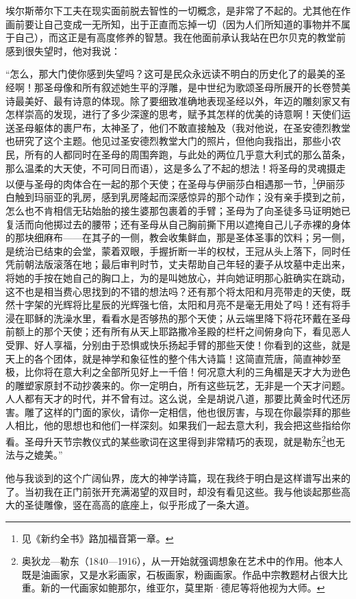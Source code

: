 \par 埃尔斯蒂尔下工夫在现实面前脱去智性的一切概念，是非常了不起的。尤其他在作画前要让自己变成一无所知，出于正直而忘掉一切（因为人们所知道的事物并不属于自己），而这正是有高度修养的智慧。我在他面前承认我站在巴尔贝克的教堂前感到很失望时，他对我说：
\par “怎么，那大门使你感到失望吗？这可是民众永远读不明白的历史化了的最美的圣经啊！那圣母像和所有叙述她生平的浮雕，是中世纪为歌颂圣母所展开的长卷赞美诗最美好、最有诗意的体现。除了要细致准确地表现圣经以外，年迈的雕刻家又有怎样崇高的发现，进行了多少深邃的思考，赋予其怎样的优美的诗意啊！天使们运送圣母躯体的裹尸布，太神圣了，他们不敢直接触及（我对他说，在圣安德烈教堂也研究了这个主题。他见过圣安德烈教堂大门的照片，但他向我指出，那些小农民，所有的人都同时在圣母的周围奔跑，与此处的两位几乎意大利式的那么苗条，那么温柔的大天使，不可同日而语），这是多么了不起的想法！将圣母的灵魂摄走以便与圣母的肉体合在一起的那个天使；在圣母与伊丽莎白相遇那一节，\footnote{见《新约全书》路加福音第一章。}伊丽莎白触到玛丽亚的乳房，感到乳房隆起而深感惊异的那个动作；没有亲手摸到之前，怎么也不肯相信无玷始胎的接生婆那包裹着的手臂；圣母为了向圣徒多马证明她已复活而向他掷过去的腰带；还有圣母从自己胸前撕下用以遮掩自己儿子赤裸的身体的那块细麻布——在其子的一侧，教会收集鲜血，那是圣体圣事的饮料；另一侧，是统治已结束的会堂，蒙着双眼，手握折断一半的权杖，王冠从头上落下，同时任凭前朝法版滚落在地；最后审判时节，丈夫帮助自己年轻的妻子从坟墓中走出来，将她的手按在她自己的胸口上，为的是叫她放心，并向她证明那心脏确实在跳动，这不也是相当费心思找到的不错的想法吗？还有那个将太阳和月亮带走的天使，既然十字架的光辉将比星辰的光辉强七倍，太阳和月亮不是毫无用处了吗！还有将手浸在耶稣的洗澡水里，看看水是否够热的那个天使；从云端里降下将花环戴在圣母前额上的那个天使；还有所有从天上耶路撒冷圣殿的栏杆之间俯身向下，看见恶人受罪、好人享福，分别由于恐惧或快乐扬起手臂的那些天使！你看到的这些，就是天上的各个团体，就是神学和象征性的整个伟大诗篇！这简直荒唐，简直神妙至极，比你将在意大利之全部所见好上一千倍！何况意大利的三角楣是天才大为逊色的雕塑家原封不动抄袭来的。你一定明白，所有这些玩艺，无非是一个天才问题。人人都有天才的时代，并不曾有过。这么说，全是胡说八道，那要比黄金时代还厉害。雕了这样的门面的家伙，请你一定相信，他也很厉害，与现在你最崇拜的那些人相比，他的思想也和他们一样深刻。如果我们一起去意大利，我会把这些指给你看。圣母升天节宗教仪式的某些歌词在这里得到非常精巧的表现，就是勒东\footnote{奥狄龙—勒东（1840—1916），从一开始就强调想象在艺术中的作用。他本人既是油画家，又是水彩画家，石板画家，粉画画家。作品中宗教题材占很大比重。新的一代画家如鲍那尔，维亚尔，莫里斯·德尼等将他视为大师。}也无法与之媲美。”
\par 他与我谈到的这个广阔仙界，庞大的神学诗篇，现在我终于明白是这样谱写出来的了。当初我在正门前张开充满渴望的双目时，却没有看见这些。我与他谈起那些高大的圣徒雕像，竖在高高的底座上，似乎形成了一条大道。

